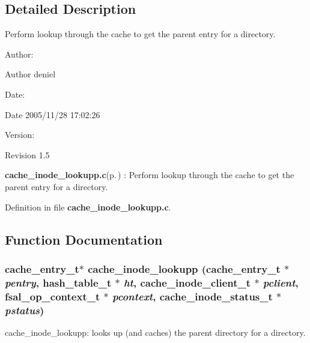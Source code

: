 \subsection{Detailed Description}
Perform lookup through the cache to get the parent entry for a directory. 

\begin{Desc}
\item[Author:]\begin{Desc}
\item[Author]deniel \end{Desc}
\end{Desc}
\begin{Desc}
\item[Date:]\begin{Desc}
\item[Date]2005/11/28 17:02:26 \end{Desc}
\end{Desc}
\begin{Desc}
\item[Version:]\begin{Desc}
\item[Revision]1.5 \end{Desc}
\end{Desc}
{\bf cache\_\-inode\_\-lookupp.c}{\rm (p.\,\pageref{cache__inode__lookupp_8c})} : Perform lookup through the cache to get the parent entry for a directory.

Definition in file {\bf cache\_\-inode\_\-lookupp.c}.

\subsection{Function Documentation}
\subsubsection{\setlength{\rightskip}{0pt plus 5cm}cache\_\-entry\_\-t$\ast$ cache\_\-inode\_\-lookupp (cache\_\-entry\_\-t $\ast$ {\em pentry}, hash\_\-table\_\-t $\ast$ {\em ht}, cache\_\-inode\_\-client\_\-t $\ast$ {\em pclient}, fsal\_\-op\_\-context\_\-t $\ast$ {\em pcontext}, cache\_\-inode\_\-status\_\-t $\ast$ {\em pstatus})}\label{cache__inode__lookupp_8c_a1}


cache\_\-inode\_\-lookupp: looks up (and caches) the parent directory for a directory.

